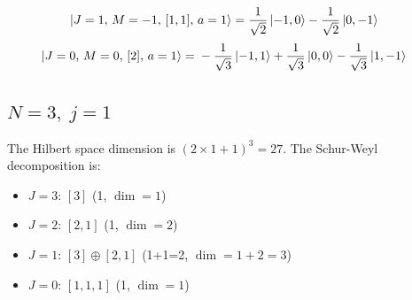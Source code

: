 \documentclass{article}
\begin{document}
\begin{equation*}
\begin{aligned}
\ket{J=1,\,M=-1,\,[1,1],\,a=1} = \; &\frac{1}{\sqrt{2}} \ket{-1,0} - \frac{1}{\sqrt{2}} \ket{0,-1}
\end{aligned}
\end{equation*}
\begin{equation*}
\begin{aligned}
\ket{J=0,\,M=0,\,[2],\,a=1} = \; &- \frac{1}{\sqrt{3}} \ket{-1,1} + \frac{1}{\sqrt{3}} \ket{0,0} - \frac{1}{\sqrt{3}} \ket{1,-1}
\end{aligned}
\end{equation*}
\subsection*{$N=3,\; j=1$}

The Hilbert space dimension is $(2\times 1 +1)^{3}=27$.
The Schur-Weyl decomposition is:
\begin{itemize}
  \item $J=3$: $[3]$ (1, $\dim = 1$)
  \item $J=2$: $[2,1]$ (1, $\dim = 2$)
  \item $J=1$: $[3] \oplus [2,1]$ (1+1=2, $\dim = 1+2=3$)
  \item $J=0$: $[1,1,1]$ (1, $\dim = 1$)
\end{itemize}
\end{document}
